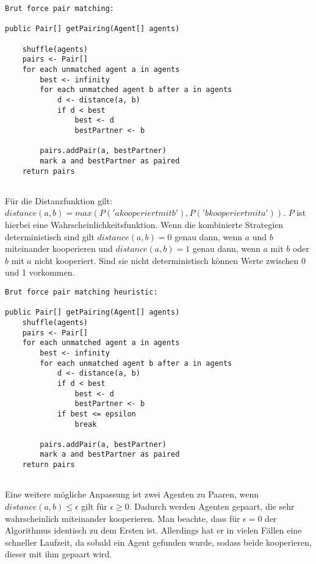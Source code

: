 \begin{lstlisting}
Brut force pair matching:

public Pair[] getPairing(Agent[] agents) 

	shuffle(agents)
	pairs <- Pair[]
	for each unmatched agent a in agents
		best <- infinity
		for each unmatched agent b after a in agents
			d <- distance(a, b)
			if d < best
				best <- d
				bestPartner <- b
				
		pairs.addPair(a, bestPartner)
		mark a and bestPartner as paired		
	return pairs	
	
\end{lstlisting}

Für die Distanzfunktion gilt: $distance(a, b) = max(P('a kooperiert mit b'), P('b kooperiert mit a'))$. $P$ ist hierbei eine Wahrscheinlichkeitsfunktion. Wenn die kombinierte Strategien deterministisch sind gilt $distance(a, b) = 0$ genau dann, wenn $a$ und $b$ miteinander kooperieren und $distance(a, b) = 1$ genau dann, wenn $a$ mit $b$ oder $b$ mit $a$ nicht kooperiert. Sind sie nicht deterministisch können Werte zwischen 0 und 1 vorkommen.

\begin{lstlisting}
Brut force pair matching heuristic:

public Pair[] getPairing(Agent[] agents) 
	shuffle(agents)
	pairs <- Pair[]
	for each unmatched agent a in agents
		best <- infinity
		for each unmatched agent b after a in agents
			d <- distance(a, b)			
			if d < best
				best <- d
				bestPartner <- b
			if best <= epsilon
				break			
						
		pairs.addPair(a, bestPartner)
		mark a and bestPartner as paired
	return pairs		
	
\end{lstlisting}

Eine weitere mögliche Anpassung ist zwei Agenten zu Paaren, wenn $distance(a, b) \leq \epsilon$ gilt für $\epsilon \geq 0$. Dadurch werden Agenten gepaart, die sehr wahrscheinlich miteinander kooperieren. Man beachte, dass für $\epsilon = 0$ der Algorithmus identisch zu dem Ersten ist. Allerdings hat er in vielen Fällen eine schneller Laufzeit, da sobald ein Agent gefunden wurde, sodass beide kooperieren, dieser mit ihm gepaart wird.
